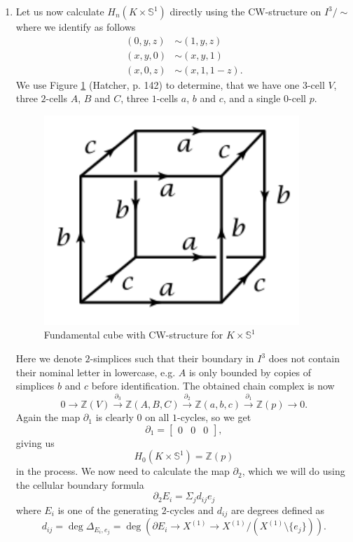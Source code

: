 \documentclass[a4paper, 12pt]{article}
\renewcommand{\S}{\mathbb{S}}
\newcommand{\Z}{\mathbb{Z}}
\begin{document}
\begin{enumerate}
	\item Let us now calculate $H_n(K\times\S^1)$ directly using the CW-structure on $I^3/\sim$ where we identify as follows
	\begin{align*}
	(0, y, z) &\sim (1, y, z) \\
	(x, y, 0) &\sim (x, y, 1) \\
	(x, 0, z) &\sim (x, 1, 1 - z).
	\end{align*}
	We use Figure \ref{fig:prod} (Hatcher, p. 142) to determine, that we have one $3$-cell $V$, three $2$-cells $A$, $B$ and $C$, three $1$-cells $a$, $b$ and $c$, and a single $0$-cell $p$.
	\begin{figure}[h]
		\centering
		\includegraphics[scale=0.4]{prod1.png}
		\caption{Fundamental cube with CW-structure for $K\times\S^1$}
		\label{fig:prod}
	\end{figure}
	Here we denote $2$-simplices such that their boundary in $I^3$ does not contain their nominal letter in lowercase, e.g. $A$ is only bounded by copies of simplices $b$ and $c$ before identification.
	The obtained chain complex is now
	\[
	0 \xrightarrow{} \Z(V) \xrightarrow{\partial_3} \Z(A, B, C) \xrightarrow{\partial_2} \Z(a, b, c) \xrightarrow{\partial_1} \Z(p) \to 0.
	\]
	Again the map $\partial_1$ is clearly $0$ on all $1$-cycles, so we get
	\[
	\partial_1 = \begin{bmatrix}
	0 & 0 & 0
	\end{bmatrix},
	\]
	giving us
	\[
	H_0(K\times\S^1) = \Z(p)
	\]
	in the process.
	We now need to calculate the map $\partial_2$, which we will do using the cellular boundary formula
	\[
	\partial_2 E_i = \Sigma_j d_{ij}e_j
	\]
	where $E_i$ is one of the generating $2$-cycles and $d_{ij}$ are degrees defined as
	\[
	d_{ij} = \deg \Delta_{E_i,e_j} = \deg (\partial E_i \to X^{(1)} \to X^{(1)}/(X^{(1)}\setminus\lbrace e_j \rbrace)).
\]
\end{enumerate}
\end{document}
